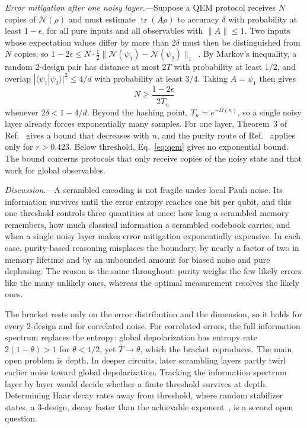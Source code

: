 \documentclass[aps,prl,reprint,superscriptaddress,amsmath,amssymb]{revtex4-2}
\newcommand{\Tb}{\overline T}
\newcommand{\N}{\mathcal N}
\newcommand{\tr}{\operatorname{tr}}
\begin{document}
\emph{Error mitigation after one noisy layer.}---Suppose a QEM protocol receives
$N$ copies of $\N(\rho)$ and must estimate $\tr(A\rho)$ to accuracy $\delta$
with probability at least $1-\epsilon$, for all pure inputs and all observables
with $\|A\|\le1$. Two inputs whose expectation values differ by more than
$2\delta$ must then be distinguished from $N$ copies, so
$1-2\epsilon\le N\cdot\frac12\|\N(\psi_1)-\N(\psi_2)\|_1$~\cite{Takagi}. By
Markov's inequality, a random 2-design pair has distance at most $2\Tb$ with
probability at least $1/2$, and overlap $|\langle\psi_1|\psi_2\rangle|^2\le4/d$
with probability at least $3/4$. Taking $A=\psi_1$ then gives
\begin{equation}
N\ge\frac{1-2\epsilon}{2\Tb_n}
\label{eq:qem}
\end{equation}
whenever $2\delta<1-4/d$. Beyond the hashing point, $\Tb_n=e^{-\Omega(n)}$, so a
single noisy layer already forces exponentially many samples. For one layer,
Theorem~3 of Ref.~\cite{Takagi} gives a bound that decreases with $n$, and the
purity route of Ref.~\cite{Quek} applies only for $r>0.423$. Below threshold,
Eq.~\eqref{eq:qem} gives no exponential bound. The bound concerns protocols
that only receive copies of the noisy state and that work for global
observables.

\emph{Discussion.}---A scrambled encoding is not fragile under local Pauli noise.
Its information survives until the error entropy reaches one bit per qubit,
and this one threshold controls three quantities at once: how long a scrambled
memory remembers, how much classical information a scrambled codebook carries,
and when a single noisy layer makes error mitigation exponentially expensive.
In each case, purity-based reasoning misplaces the boundary, by nearly a factor
of two in memory lifetime and by an unbounded amount for biased noise and pure
dephasing. The reason is the same throughout: purity weighs the few likely
errors like the many unlikely ones, whereas the optimal measurement resolves
the likely ones.

The bracket rests only on the error distribution and the dimension, so it holds
for every 2-design and for correlated noise. For correlated errors, the full
information spectrum replaces the entropy: global depolarization has entropy
rate $2(1-\theta)>1$ for $\theta<1/2$, yet $\Tb\to\theta$, which the bracket
reproduces. The main open problem is depth. In deeper circuits, later
scrambling layers partly twirl earlier noise toward global depolarization.
Tracking the information spectrum layer by layer would decide whether a finite
threshold survives at depth. Determining Haar decay rates away from threshold,
where random stabilizer states, a 3-design, decay faster than the achievable
exponent~\cite{DataRepo}, is a second open question.
\end{document}
